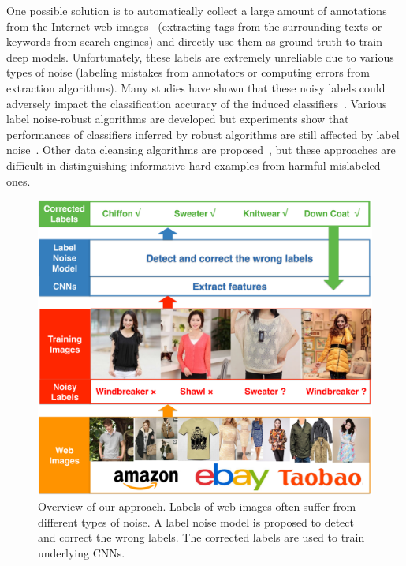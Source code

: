 \documentclass[10pt,twocolumn,letterpaper]{article}
\begin{document}
One possible solution is to automatically collect a large amount of annotations from the Internet web images~\cite{gong2014multiview} (\ie extracting tags from the surrounding texts or keywords from search engines) and directly use them as ground truth to train deep models. Unfortunately, these labels are extremely unreliable due to various types of noise (\eg labeling mistakes from annotators or computing errors from extraction algorithms). Many studies have shown that these noisy labels could adversely impact the classification accuracy of the induced classifiers~\cite{zhu2004class,nettleton2010study,pechenizkiy2006class}. Various label noise-robust algorithms are developed but experiments show that performances of classifiers inferred by robust algorithms are still affected by label noise~\cite{bartlett2006convexity,teng2001comparison}. Other data cleansing algorithms are proposed~\cite{barandela2000decontamination,brodley2011identifying,miranda2009use}, but these approaches are difficult in distinguishing informative hard examples from harmful mislabeled ones.

\begin{figure}[t]
\begin{center}
\includegraphics[width=1.0\linewidth]{figure/overview.pdf}
\end{center}
\caption{Overview of our approach. Labels of web images often suffer from different types of noise. A label noise model is proposed to detect and correct the wrong labels. The corrected labels are used to train underlying CNNs.}
\label{fig:overview}
\end{figure}
\end{document}
